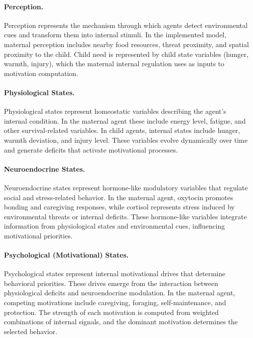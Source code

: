 \paragraph{Perception.}
Perception represents the mechanism through which agents detect environmental cues and transform them into internal stimuli. In the implemented model, maternal perception includes nearby food resources, threat proximity, and spatial proximity to the child. Child need is represented by child state variables (hunger, warmth, injury), which the maternal internal regulation uses as inputs to motivation computation.





\paragraph{Physiological States.}
Physiological states represent homeostatic variables describing the agent’s internal condition. In the maternal agent these include energy level, fatigue, and other survival-related variables. In child agents, internal states include hunger, warmth deviation, and injury level. These variables evolve dynamically over time and generate deficits that activate motivational processes.





\paragraph{Neuroendocrine States.}
Neuroendocrine states represent hormone-like modulatory variables that regulate social and stress-related behavior. In the maternal agent, oxytocin promotes bonding and caregiving responses, while cortisol represents stress induced by environmental threats or internal deficits. These hormone-like variables integrate information from physiological states and environmental cues, influencing motivational priorities.

\paragraph{Psychological (Motivational) States.}
Psychological states represent internal motivational drives that determine behavioral priorities. These drives emerge from the interaction between physiological deficits and neuroendocrine modulation. In the maternal agent, competing motivations include caregiving, foraging, self-maintenance, and protection. The strength of each motivation is computed from weighted combinations of internal signals, and the dominant motivation determines the selected behavior.


